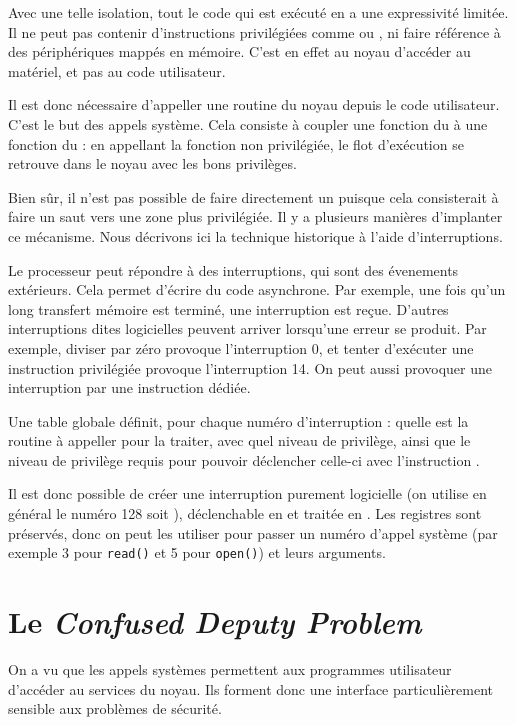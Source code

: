 Avec une telle isolation, tout le code qui est exécuté en  a une
expressivité limitée. Il ne peut pas contenir d'instructions privilégiées comme
 ou , ni faire référence à des périphériques mappés
en mémoire. C'est en effet au noyau d'accéder au matériel, et pas au code
utilisateur.

Il est donc nécessaire d'appeller une routine du noyau depuis le code
utilisateur. C'est le but des appels système. Cela consiste à coupler une
fonction du  à une fonction du : en appellant la fonction non
privilégiée, le flot d'exécution se retrouve dans le noyau avec les bons
privilèges.

Bien sûr, il n'est pas possible de faire directement un  puisque
cela consisterait à faire un saut vers une zone plus privilégiée. Il y a
plusieurs manières d'implanter ce mécanisme. Nous décrivons ici la technique
historique à l'aide d'interruptions.

Le processeur peut répondre à des interruptions, qui sont des évenements
extérieurs. Cela permet d'écrire du code asynchrone. Par exemple, une fois qu'un
long transfert mémoire est terminé, une interruption est reçue. D'autres
interruptions dites logicielles peuvent arriver lorsqu'une erreur se produit.
Par exemple, diviser par zéro provoque l'interruption 0, et tenter d'exécuter
une instruction privilégiée provoque l'interruption 14. On peut aussi provoquer
une interruption par une instruction  dédiée.

Une table globale définit, pour chaque numéro d'interruption : quelle est la
routine à appeller pour la traiter, avec quel niveau de privilège, ainsi que le
niveau de privilège requis pour pouvoir déclencher celle-ci avec l'instruction
.

Il est donc possible de créer une interruption purement logicielle (on utilise
en général le numéro 128 soit ), déclenchable en  et traitée en
. Les registres sont préservés, donc on peut les utiliser pour passer un
numéro d'appel système (par exemple 3 pour \texttt{read()} et 5 pour
\texttt{open()}) et leurs arguments.

\section{Le \emph{Confused Deputy Problem}}
\label{sec:secu-syscalls}

On a vu que les appels systèmes permettent aux programmes utilisateur d'accéder
au services du noyau. Ils forment donc une interface particulièrement sensible aux
problèmes de sécurité.

